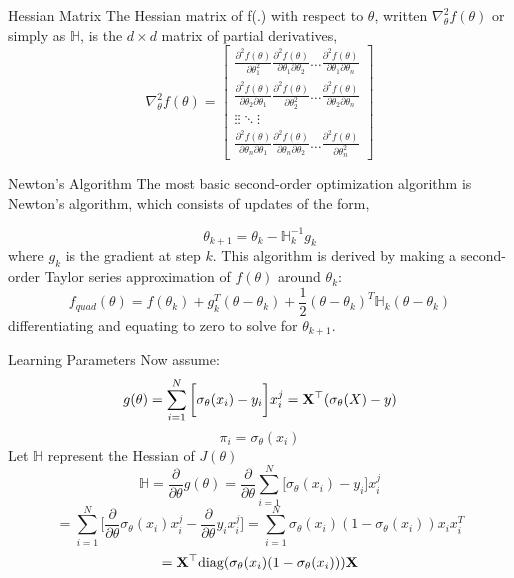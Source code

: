 \documentclass{beamer}
\begin{document}
\begin{frame}{Hessian Matrix}
The Hessian matrix of f(.) with respect to $\theta$, written $\nabla _{\theta}^{2}f(\theta)$ or simply as $\mathbb{H}$, is the $d \times d$ matrix of partial derivatives,
\begin{equation*}
\nabla _{\theta}^{2}f(\theta) = \begin{bmatrix} 
\frac{\partial^{2}f(\theta)}{\partial \theta_{1}^{2}} \frac{\partial^{2}f(\theta)}{\partial \theta_{1}\partial \theta_{2}} \ldots \frac{\partial^{2}f(\theta)}{\partial \theta_{1}\partial \theta_{n}} \\
\frac{\partial^{2}f(\theta)}{\partial \theta_{2}\partial \theta_{1}} \frac{\partial^{2}f(\theta)}{\partial \theta_{2}^{2}} \ldots \frac{\partial^{2}f(\theta)}{\partial \theta_{2}\partial \theta_{n}} \\
\vdots \vdots \ddots \vdots \\
\frac{\partial^{2}f(\theta)}{\partial \theta_{n} \partial \theta_{1}} \frac{\partial^{2}f(\theta)}{\partial \theta_{n}\partial \theta_{2}} \ldots \frac{\partial^{2}f(\theta)}{\partial \theta_{n}^{2}}
\end{bmatrix}
\end{equation*}

\end{frame}
\begin{frame}{Newton's Algorithm}
The most basic second-order optimization algorithm is Newton's algorithm, which consists of updates of the form,

$$\theta_{k+1} = \theta_{k} - \mathbb{H}_{k}^{-1}g_{k}$$
where $g_{k}$ is the gradient at step $k$. This algorithm is derived by making a second-order Taylor series approximation of $f(\theta)$ around $\theta_{k}$:
$$f_{quad}(\theta) = f(\theta_{k}) + g_{k}^{T}(\theta - \theta_{k}) + \frac{1}{2}(\theta - \theta_{k})^{T}\mathbb{H}_{k}(\theta - \theta_{k})$$
differentiating and equating to zero to solve for $\theta_{k+1}$.
\end{frame}
\begin{frame}{Learning Parameters}
Now assume:
$$g(\theta) = \sum_{i=1}^{N}\bigg[\sigma_{\theta}(x_{i}) - y_{i}\bigg]x_{i}^{j} = \mathbf{X}^\top(\sigma_{\theta}(X) - y)$$
$$\pi_{i} = \sigma_{\theta}(x_{i})$$
Let $\mathbb{H}$ represent the Hessian of $J(\theta)$
\[
\mathbb{H} = \frac{\partial}{\partial \theta} g(\theta) = \frac{\partial}{\partial \theta} \sum_{i=1}^{N} \bigg[\sigma_{\theta}(x_{i}) - y_{i}\bigg]x_{i}^{j}
\]
\[
= \sum_{i=1}^{N} \bigg[\frac{\partial}{\partial \theta}\sigma_{\theta}(x_{i})x_{i}^{j} - \frac{\partial}{\partial \theta} y_{i}x_{i}^{j}\bigg] = \sum_{i=1}^{N} \sigma_{\theta}(x_{i}) (1 - \sigma_{\theta}(x_{i}))x_{i}x_{i}^{T}
\]
\[
= \mathbf{X}^\top\text{diag}(\sigma_{\theta}(x_{i}) (1 - \sigma_{\theta}(x_{i})))\mathbf{X}
\]
\end{frame}
\end{document}
